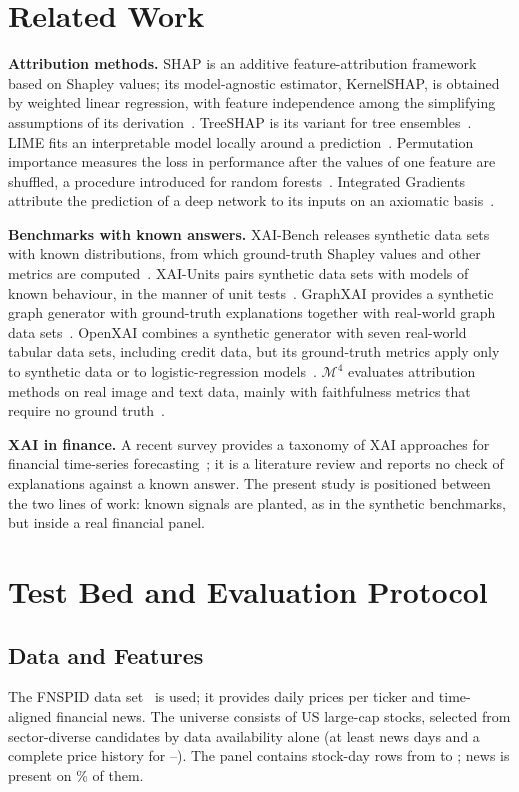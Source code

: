 \documentclass[conference]{IEEEtran}
\begin{document}
\section{Related Work}
\label{sec:related}
\textbf{Attribution methods.} SHAP is an additive feature-attribution
framework based on Shapley values; its model-agnostic estimator, KernelSHAP,
is obtained by weighted linear regression, with feature independence among
the simplifying assumptions of its derivation~\cite{lundberg2017shap}.
TreeSHAP is its variant for tree ensembles~\cite{lundberg2020treeshap}. LIME
fits an interpretable model locally around a
prediction~\cite{ribeiro2016lime}. Permutation importance measures the loss
in performance after the values of one feature are shuffled, a procedure
introduced for random forests~\cite{breiman2001random}. Integrated Gradients
attribute the prediction of a deep network to its inputs on an axiomatic
basis~\cite{sundararajan2017ig}.

\textbf{Benchmarks with known answers.} XAI-Bench releases synthetic data
sets with known distributions, from which ground-truth Shapley values and
other metrics are computed~\cite{liu2021xaibench}. XAI-Units pairs synthetic
data sets with models of known behaviour, in the manner of unit
tests~\cite{lee2025xaiunits}. GraphXAI provides a synthetic graph generator
with ground-truth explanations together with real-world graph data
sets~\cite{agarwal2023graphxai}. OpenXAI combines a synthetic generator with
seven real-world tabular data sets, including credit data, but its
ground-truth metrics apply only to synthetic data or to logistic-regression
models~\cite{agarwal2022openxai}. $\mathcal{M}^4$ evaluates attribution
methods on real image and text data, mainly with faithfulness metrics that
require no ground truth~\cite{li2023m4}.

\textbf{XAI in finance.} A recent survey provides a taxonomy of XAI
approaches for financial time-series
forecasting~\cite{arsenault2025xaifinance}; it is a literature review and
reports no check of explanations against a known answer. The present study
is positioned between the two lines of work: known signals are planted, as
in the synthetic benchmarks, but inside a real financial panel.

\section{Test Bed and Evaluation Protocol}
\label{sec:testbed}
\subsection{Data and Features}
The FNSPID data set~\cite{dong2024fnspid} is used; it provides daily prices
per ticker and time-aligned financial news. The universe consists of \nTickers{}
US large-cap stocks, selected from \nCandidates{} sector-diverse candidates
by data availability alone (at least \minNewsDays{} news days and a complete
price history for \dateMin--\dateMax). The panel contains \nObs{} stock-day
rows from \panelStart{} to \panelEnd; news is present on \newsCov\% of them.
\end{document}
